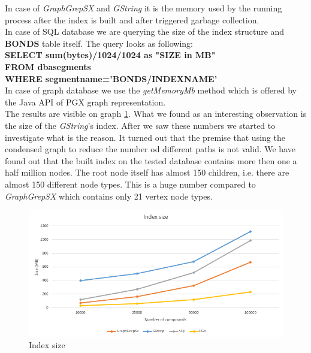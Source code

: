 In case of \textit{GraphGrepSX} and \textit{GString} it is the memory used by the running process after the index is built and after triggered garbage collection.\\

In case of SQL database we are querying the size of the index structure and \textbf{BONDS} table itself. The query looks as following:\\

\noindent\textbf{SELECT sum(bytes)/1024/1024 as "SIZE in MB"}\\
\phantom{x}\hspace{3ex} \textbf{FROM dba\textunderscore segments}\\
\phantom{x}\hspace{3ex} \textbf{WHERE segment\textunderscore name='BONDS/INDEX\textunderscore NAME'}\\

In case of graph database we use the \textit{getMemoryMb} method which is offered by the Java API of PGX graph representation.\\

The results are visible on graph \ref{fig:indexsize}. What we found as an interesting observation is the size of the \textit{GString}'s index. After we saw these numbers we started to investigate what is the reason. It turned out that the premise that using the condensed graph to reduce the number od different paths is not valid. We have found out that the built index on the tested database contains more then one a half million nodes. The root node itself has almost 150 children, i.e. there are almost 150 different node types. This is a huge number compared to \textit{GraphGrepSX} which contains only 21 vertex node types.\\

\begin{figure}[h]
	\centering
	\includegraphics[width=1\textwidth]{../img/indexSize.png}
	\caption{Index size}
	\label{fig:indexsize}
\end{figure}

